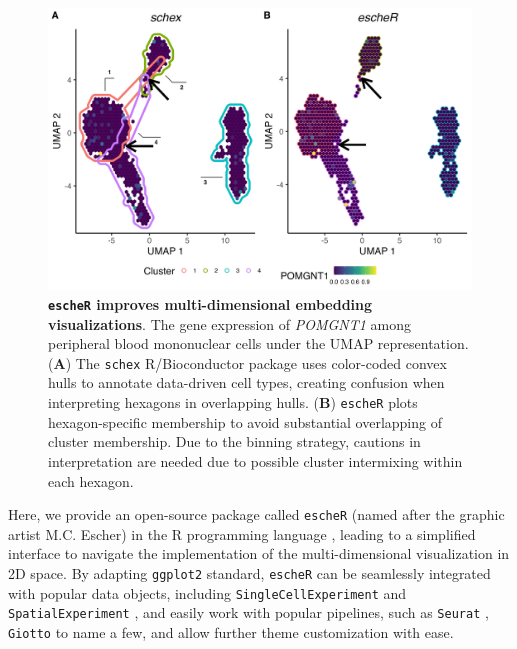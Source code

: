 \documentclass[unnumsec,webpdf,modern,large,namedate]{oup-authoring-template}%
\theoremstyle{thmstyleone}%
\theoremstyle{thmstyletwo}%
\theoremstyle{thmstylethree}%
\begin{document}
\begin{figure}[t]
\begin{center}
\includegraphics[width=\textwidth]{Manuscript/figure/embedding.jpg}
\caption{\small \textbf{\texttt{escheR} improves multi-dimensional embedding visualizations}. The gene expression of \textit{POMGNT1} among peripheral blood mononuclear cells \citep{PBMC} under the UMAP representation. (\textbf{A}) The \texttt{schex} R/Bioconductor package uses color-coded convex hulls to annotate data-driven cell types, creating confusion when interpreting hexagons in overlapping hulls. (\textbf{B}) \texttt{escheR} plots hexagon-specific membership to avoid substantial overlapping of cluster membership. Due to the binning strategy, cautions in interpretation are needed due to possible cluster intermixing within each hexagon.} 
\label{fig:embedding} 
\end{center}
\vspace{-0.3in}
\end{figure}

Here, we provide an open-source package called \texttt{escheR} (named after the graphic artist M.C. Escher) in the R programming language \citep{R}, leading to a simplified interface to navigate the implementation of the multi-dimensional visualization in 2D space. By adapting \texttt{ggplot2} standard, \texttt{escheR} can be seamlessly integrated with popular data objects, including \texttt{SingleCellExperiment} \citep{amezquita2020} and \texttt{SpatialExperiment} \citep{righelli2022}, and easily work with popular pipelines, such as \texttt{Seurat} \citep{hao_2021}, \texttt{Giotto} \citep{dries_2021} to name a few, and allow further theme customization with ease.
\end{document}
